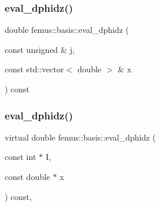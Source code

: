 \mbox{\label{classfemus_1_1basis_a0a7e19ca2f5b312392bc34a64e8f2cf3}} 
\subsubsection{\texorpdfstring{eval\+\_\+dphidz()}{eval\_dphidz()}\hspace{0.1cm}{\footnotesize\ttfamily [1/2]}}
{\footnotesize\ttfamily double femus\+::basis\+::eval\+\_\+dphidz (\begin{DoxyParamCaption}\item[{const unsigned \&}]{j,  }\item[{const std\+::vector$<$ double $>$ \&}]{x }\end{DoxyParamCaption}) const\hspace{0.3cm}{\ttfamily [inline]}}

\mbox{\label{classfemus_1_1basis_affd9927f6e25e264108219d862b8cb3d}} 
\subsubsection{\texorpdfstring{eval\+\_\+dphidz()}{eval\_dphidz()}\hspace{0.1cm}{\footnotesize\ttfamily [2/2]}}
{\footnotesize\ttfamily virtual double femus\+::basis\+::eval\+\_\+dphidz (\begin{DoxyParamCaption}\item[{const int $\ast$}]{I,  }\item[{const double $\ast$}]{x }\end{DoxyParamCaption}) const\hspace{0.3cm}{\ttfamily [inline]}, {\ttfamily [virtual]}}



